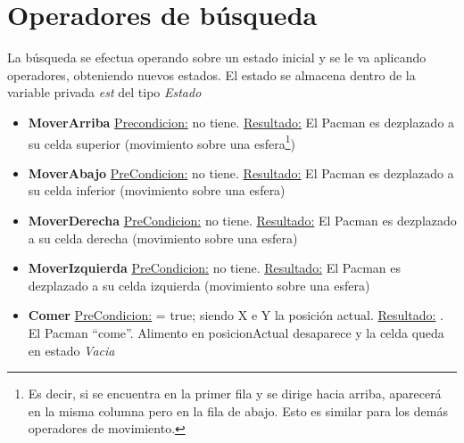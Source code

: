 \section{Operadores de búsqueda}
La búsqueda se efectua operando sobre un estado inicial y se le va aplicando operadores, obteniendo nuevos estados.\newline
El estado se almacena dentro de la variable privada \textit{est} del tipo \textit{Estado}\newline
{}

\begin{itemize}

\item \textbf{MoverArriba}\newline
\underline{Precondicion:} no tiene.\newline
\underline{Resultado:} El Pacman es dezplazado a su celda superior (movimiento
sobre una esfera\footnote{Es decir, si se encuentra en la primer fila y se
dirige hacia arriba, aparecerá en la misma columna pero en la fila de abajo.
Esto es similar para los demás operadores de movimiento.})

\item \textbf{MoverAbajo}\newline
\underline{PreCondicion:}  no tiene.\newline
\underline{Resultado:} El Pacman es dezplazado a su celda inferior (movimiento
sobre una esfera)\newline
\verbatim{
}

\item \textbf{MoverDerecha}\newline
\underline{PreCondicion:}  no tiene.\newline
\underline{Resultado:} El Pacman es dezplazado a su celda derecha (movimiento
sobre una esfera)\newline
\verbatim{
}

\item \textbf{MoverIzquierda}\newline
\underline{PreCondicion:}  no tiene.\newline
\underline{Resultado:} El Pacman es dezplazado a su celda izquierda (movimiento
sobre una esfera)\newline
\verbatim{
}

\item \textbf{Comer}\newline
\underline{PreCondicion:}  = true; siendo X e Y la posición actual.\newline
\underline{Resultado:} . El Pacman ``come''. Alimento en posicionActual desaparece
y la celda queda en estado \textit{Vacia}\newline
{}


\end{itemize}
